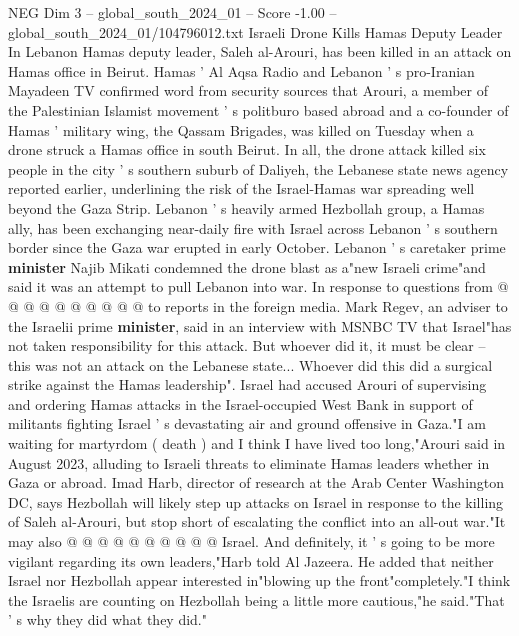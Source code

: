 \begin{textsample}{NEG Dim 3 – global\_south\_2024\_01 – Score -1.00 – global\_south\_2024\_01/104796012.txt}  \label{ex:f3_neg_076}
Israeli Drone Kills Hamas Deputy Leader In Lebanon Hamas deputy leader, Saleh al-Arouri, has been killed in an attack on Hamas office in Beirut.
Hamas ' Al Aqsa Radio and Lebanon ' s pro-Iranian Mayadeen TV confirmed word from security sources that Arouri, a member of the Palestinian Islamist movement ' s politburo based abroad and a co-founder of Hamas ' military wing, the Qassam Brigades, was killed on Tuesday when a drone struck a Hamas office in south Beirut.
In all, the drone attack killed six people in the city ' s southern suburb of Daliyeh, the Lebanese state news agency reported earlier, underlining the risk of the Israel-Hamas war spreading well beyond the Gaza Strip.
Lebanon ' s heavily armed Hezbollah group, a Hamas ally, has been exchanging near-daily fire with Israel across Lebanon ' s southern border since the Gaza war erupted in early October.
Lebanon ' s caretaker prime \textbf{minister} Najib Mikati condemned the drone blast as a"new Israeli crime"and said it was an attempt to pull Lebanon into war.
In response to questions from @ @ @ @ @ @ @ @ @ @ to reports in the foreign media.
Mark Regev, an adviser to the Israelii prime \textbf{minister}, said in an interview with MSNBC TV that Israel"has not taken responsibility for this attack.
But whoever did it, it must be clear -- this was not an attack on the Lebanese state...
Whoever did this did a surgical strike against the Hamas leadership".
Israel had accused Arouri of supervising and ordering Hamas attacks in the Israel-occupied West Bank in support of militants fighting Israel ' s devastating air and ground offensive in Gaza."I am waiting for martyrdom ( death ) and I think I have lived too long,"Arouri said in August 2023, alluding to Israeli threats to eliminate Hamas leaders whether in Gaza or abroad.
Imad Harb, director of research at the Arab Center Washington DC, says Hezbollah will likely step up attacks on Israel in response to the killing of Saleh al-Arouri, but stop short of escalating the conflict into an all-out war."It may also @ @ @ @ @ @ @ @ @ @ Israel.
And definitely, it ' s going to be more vigilant regarding its own leaders,"Harb told Al Jazeera.
He added that neither Israel nor Hezbollah appear interested in"blowing up the front"completely."I think the Israelis are counting on Hezbollah being a little more cautious,"he said."That ' s why they did what they did."

\end{textsample}
